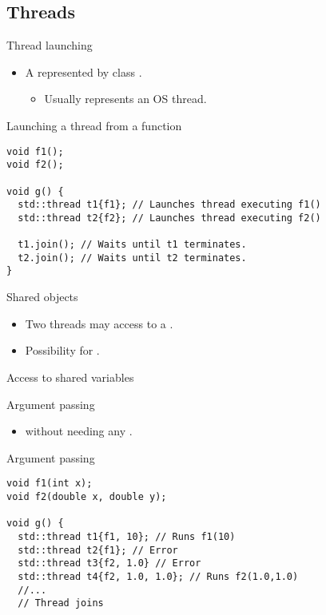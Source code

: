\subsection{Threads}

\begin{frame}[fragile]{Thread launching}
\begin{itemize}
  \item A  represented by class .
    \begin{itemize}
      \item Usually represents an OS thread.
    \end{itemize}
\end{itemize}

\begin{block}{Launching a thread from a function}
\begin{lstlisting}
void f1();
void f2();

void g() {
  std::thread t1{f1}; // Launches thread executing f1()
  std::thread t2{f2}; // Launches thread executing f2()

  t1.join(); // Waits until t1 terminates.
  t2.join(); // Waits until t2 terminates.
}
\end{lstlisting}
\end{block}
\end{frame}


\begin{frame}[fragile]{Shared objects}
\begin{itemize}
  \item Two threads may access to a .
  \item Possibility for .
\end{itemize}

\begin{block}{Access to shared variables}

\end{block}
\end{frame}

\begin{frame}[fragile]{Argument passing}
\begin{itemize}
  \item {} without needing any .
\end{itemize}

\begin{block}{Argument passing}
\begin{lstlisting}
void f1(int x);
void f2(double x, double y);

void g() {
  std::thread t1{f1, 10}; // Runs f1(10)
  std::thread t2{f1}; // Error
  std::thread t3{f2, 1.0} // Error
  std::thread t4{f2, 1.0, 1.0}; // Runs f2(1.0,1.0)
  //...
  // Thread joins 
\end{lstlisting}
\end{block}
\end{frame}

